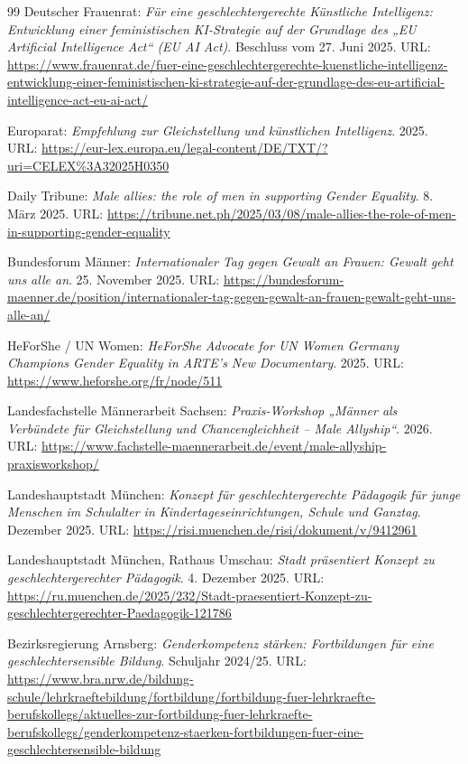 \documentclass[12pt,a4paper]{article}
\begin{document}
\begin{thebibliography}{99}
		Deutscher Frauenrat: \emph{Für eine geschlechtergerechte Künstliche Intelligenz: Entwicklung einer feministischen KI-Strategie auf der Grundlage des „EU Artificial Intelligence Act“ (EU AI Act)}. Beschluss vom 27. Juni 2025.
		URL: \url{https://www.frauenrat.de/fuer-eine-geschlechtergerechte-kuenstliche-intelligenz-entwicklung-einer-feministischen-ki-strategie-auf-der-grundlage-des-eu-artificial-intelligence-act-eu-ai-act/}
		
		Europarat: \emph{Empfehlung zur Gleichstellung und künstlichen Intelligenz}. 2025.
		URL: \url{https://eur-lex.europa.eu/legal-content/DE/TXT/?uri=CELEX\%3A32025H0350}
		
		Daily Tribune: \emph{Male allies: the role of men in supporting Gender Equality}. 8. März 2025.
		URL: \url{https://tribune.net.ph/2025/03/08/male-allies-the-role-of-men-in-supporting-gender-equality}
		
		Bundesforum Männer: \emph{Internationaler Tag gegen Gewalt an Frauen: Gewalt geht uns alle an}. 25. November 2025.
		URL: \url{https://bundesforum-maenner.de/position/internationaler-tag-gegen-gewalt-an-frauen-gewalt-geht-uns-alle-an/}
		
		HeForShe / UN Women: \emph{HeForShe Advocate for UN Women Germany Champions Gender Equality in ARTE's New Documentary}. 2025.
		URL: \url{https://www.heforshe.org/fr/node/511}
		
		Landesfachstelle Männerarbeit Sachsen: \emph{Praxis-Workshop „Männer als Verbündete für Gleichstellung und Chancengleichheit – Male Allyship“}. 2026.
		URL: \url{https://www.fachstelle-maennerarbeit.de/event/male-allyship-praxisworkshop/}
		
		Landeshauptstadt München: \emph{Konzept für geschlechtergerechte Pädagogik für junge Menschen im Schulalter in Kindertageseinrichtungen, Schule und Ganztag}. Dezember 2025.
		URL: \url{https://risi.muenchen.de/risi/dokument/v/9412961}
		
		Landeshauptstadt München, Rathaus Umschau: \emph{Stadt präsentiert Konzept zu geschlechtergerechter Pädagogik}. 4. Dezember 2025.
		URL: \url{https://ru.muenchen.de/2025/232/Stadt-praesentiert-Konzept-zu-geschlechtergerechter-Paedagogik-121786}
		
		Bezirksregierung Arnsberg: \emph{Genderkompetenz stärken: Fortbildungen für eine geschlechtersensible Bildung}. Schuljahr 2024/25.
		URL: \url{https://www.bra.nrw.de/bildung-schule/lehrkraeftebildung/fortbildung/fortbildung-fuer-lehrkraefte-berufskollegs/aktuelles-zur-fortbildung-fuer-lehrkraefte-berufskollegs/genderkompetenz-staerken-fortbildungen-fuer-eine-geschlechtersensible-bildung}
		
	\end{thebibliography}
	
\end{document}
